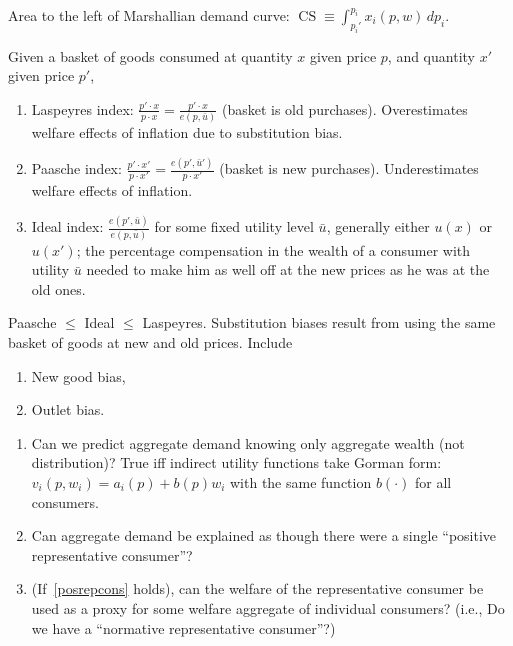 \documentclass[8pt,letterpaper, landscape]{extarticle} %
\begin{document}
\begin{multicols}{3}
\begin{description}
 Area to the left of Marshallian demand curve: $ \operatorname{CS} \equiv \int_{p_{i}'}^{p_i} x_i (p,w) \, dp_i $.

 Given a basket of goods consumed at quantity $ x $ given price $ p $, and quantity $ x' $ given price $ p' $,
\begin{enumerate}
\item Laspeyres index: $ \frac{p' \cdot x}{p \cdot x}  = \frac{p' \cdot x}{e(p, \bar{u})} $ (basket is old purchases). Overestimates welfare effects of inflation due to substitution bias.
\item Paasche index: $ \frac{p' \cdot x'}{p \cdot x'} = \frac{e(p', \bar{u}')}{p \cdot x'} $ (basket is new purchases). Underestimates welfare effects of inflation.
\item Ideal index: $ \frac{e(p',\bar{u})}{e(p,\bar{u})} $ for some fixed utility level $ \bar{u} $, generally either $ u(x) $ or $ u(x') $; the percentage compensation in the wealth of a consumer with utility $ \bar{u} $ needed to make him as well off at the new prices as he was at the old ones.
\end{enumerate}
Paasche $ \leq $ Ideal $ \leq $ Laspeyres. Substitution biases result from using the same basket of goods at new and old prices. Include
\begin{enumerate}
\item New good bias,
\item Outlet bias.
\end{enumerate}

\begin{enumerate}
\item Can we predict aggregate demand knowing only aggregate wealth (not distribution)? True iff indirect utility functions take Gorman form: $ v_i(p, w_i) = a_i(p) + b(p)w_i $ with the same function $ b(\cdot) $ for all consumers.
\item \label{posrepcons} Can aggregate demand be explained as though there were a single ``positive representative consumer''?
\item (If~\ref{posrepcons} holds), can the welfare of the representative consumer be used as a proxy for some welfare aggregate of individual consumers? (i.e., Do we have a ``normative representative consumer''?)
\end{enumerate}


\end{description}
\end{multicols}
\end{document}
